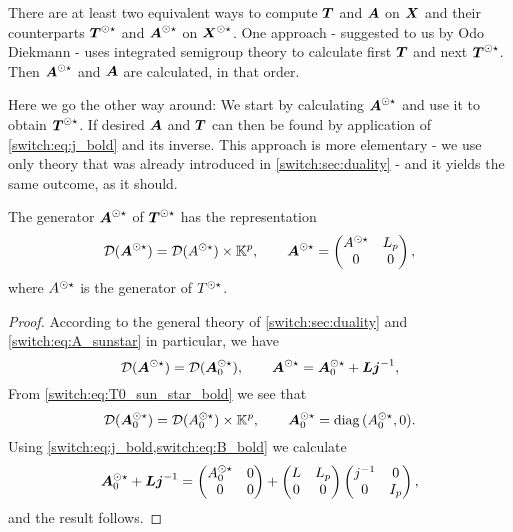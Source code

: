 \begin{remark}
  There are at least two equivalent ways to compute $\boldsymbol{T}$ and $\boldsymbol{A}$ on $\boldsymbol{X}$ and their {\WSTAR} counterparts $\boldsymbol{T}^{\odot\star}$ and $\boldsymbol{A}^{\odot\star}$ on $\boldsymbol{X}^{\odot\star}$. One approach - suggested to us by Odo Diekmann - uses integrated semigroup theory to calculate first $\boldsymbol{T}$ and next $\boldsymbol{T}^{\odot\star}$. Then $\boldsymbol{A}^{\odot\star}$ and $\boldsymbol{A}$ are calculated, in that order.

  Here we go the other way around: We start by calculating $\boldsymbol{A}^{\odot\star}$ and use it to obtain $\boldsymbol{T}^{\odot\star}$. If desired $\boldsymbol{A}$ and $\boldsymbol{T}$ can then be found by application of \cref{switch:eq:j_bold} and its inverse. This approach is more elementary - we use only theory that was already introduced in \cref{switch:sec:duality} - and it yields the same outcome, as it should.
\end{remark}

\begin{proposition}\label{switch:prop:A_sun_star_bold}
  The {\WSTAR} generator $\boldsymbol{A}^{\odot\star}$ of $\boldsymbol{T}^{\odot\star}$ has the representation
  \[
    \mathcal{D}(\boldsymbol{A}^{\odot\star}) = \mathcal{D}(A^{\odot\star})\times \mathbb{K}^p, \qquad \boldsymbol{A}^{\odot\star} =
    \begin{pmatrix}
      A^{\odot\star}& L_p\\
      0& 0
    \end{pmatrix},
  \]
  where $A^{\odot\star}$ is the {\WSTAR} generator of $T^{\odot\star}$.
\end{proposition}
\begin{proof}
  According to the general theory of \cref{switch:sec:duality} and \cref{switch:eq:A_sunstar} in particular, we have
  \[
    \mathcal{D}(\boldsymbol{A}^{\odot\star}) = \mathcal{D}(\boldsymbol{A}_0^{\odot\star}), \qquad \boldsymbol{A}^{\odot\star} = \boldsymbol{A}_0^{\odot\star} + \boldsymbol{L}\boldsymbol{j}^{-1},
  \]
  From \cref{switch:eq:T0_sun_star_bold} we see that
  \[
    \mathcal{D}(\boldsymbol{A}_0^{\odot\star}) = \mathcal{D}(A_0^{\odot\star})\times \mathbb{K}^p, \qquad \boldsymbol{A}_0^{\odot\star} = \operatorname{diag}{(A_0^{\odot\star}, 0)}.
  \]
  Using \cref{switch:eq:j_bold,switch:eq:B_bold} we calculate
  \[
    \boldsymbol{A}_0^{\odot\star} + \boldsymbol{L}\boldsymbol{j}^{-1} =
    \begin{pmatrix}
      A_0^{\odot\star}& 0\\
      0& 0
    \end{pmatrix} +
    \begin{pmatrix}
      L& L_p\\
      0& 0
    \end{pmatrix}
    \begin{pmatrix}
      j^{-1}& 0\\
      0& I_p
    \end{pmatrix},
  \]
  and the result follows.
\end{proof}

